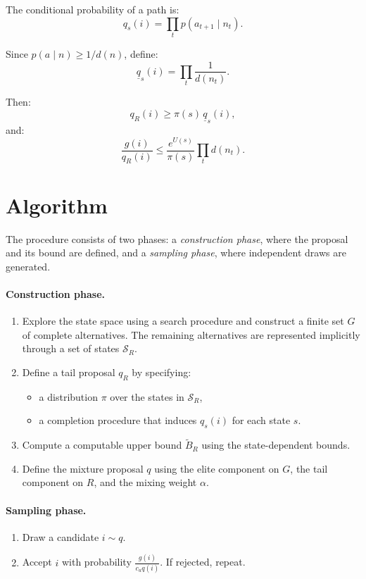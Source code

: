 \documentclass[11pt]{article}
\begin{document}
The conditional probability of a path is:
\[
q_s(i) = \prod_{t} p(a_{t+1} \mid n_t).
\]

Since $p(a \mid n) \ge 1/d(n)$, define:
\[
\underline{q}_s(i) = \prod_t \frac{1}{d(n_t)}.
\]

Then:
\[
q_R(i) \ge \pi(s)\,\underline{q}_s(i),
\]
and:
\[
\frac{g(i)}{q_R(i)}
\le
\frac{e^{U(s)}}{\pi(s)}
\prod_t d(n_t).
\]

\section{Algorithm}

The procedure consists of two phases: a \emph{construction phase}, where the proposal and its bound are defined, and a \emph{sampling phase}, where independent draws are generated.

\paragraph{Construction phase.}
\begin{enumerate}
\item Explore the state space using a search procedure and construct a finite set $G$ of complete alternatives. The remaining alternatives are represented implicitly through a set of states $\mathcal{S}_R$.
\item Define a tail proposal $q_R$ by specifying:
\begin{itemize}
\item a distribution $\pi$ over the states in $\mathcal{S}_R$,
\item a completion procedure that induces $q_s(i)$ for each state $s$.
\end{itemize}
\item Compute a computable upper bound $\widetilde{B}_R$ using the state-dependent bounds.
\item Define the mixture proposal $q$ using the elite component on $G$, the tail component on $R$, and the mixing weight $\alpha$.
\end{enumerate}

\paragraph{Sampling phase.}
\begin{enumerate}
\item Draw a candidate $i \sim q$.
\item Accept $i$ with probability $\frac{g(i)}{c_u q(i)}$. If rejected, repeat.
\end{enumerate}
\end{document}
